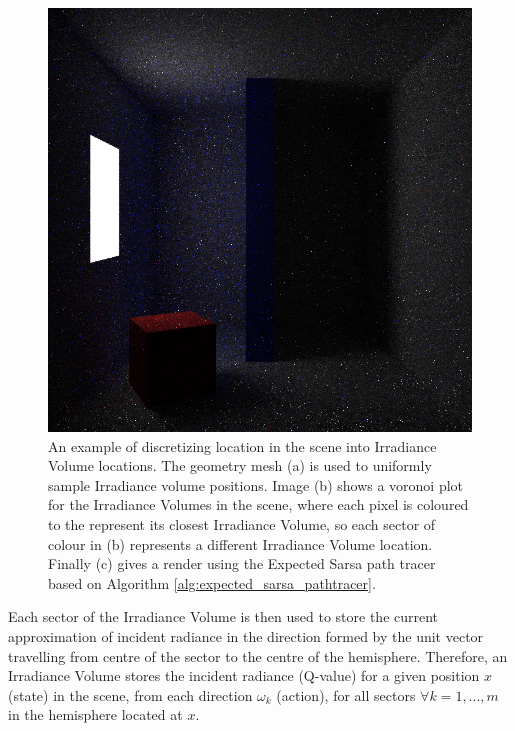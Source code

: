 \documentclass[../dissertation.tex]{subfiles}
\begin{document}
\begin{figure}[!htb]
\endminipage\hfill
{}
\includegraphics[width=1\textwidth]{images/renders/simple_room/reinforcement_16.png}
\endminipage
\caption{An example of discretizing location in the scene into Irradiance Volume locations. The geometry mesh (a) is used to uniformly sample Irradiance volume positions. Image (b) shows a voronoi plot for the Irradiance Volumes in the scene, where each pixel is coloured to the represent its closest Irradiance Volume, so each sector of colour in (b) represents a different Irradiance Volume location. Finally (c) gives a render using the Expected Sarsa path tracer based on Algorithm \ref{alg:expected_sarsa_pathtracer}.}
\label{fig:scene_discretization_example}
\end{figure}

Each sector of the Irradiance Volume is then used to store the current approximation of incident radiance in the direction formed by the unit vector travelling from centre of the sector to the centre of the hemisphere. Therefore, an Irradiance Volume stores the incident radiance (Q-value) for a given position $x$ (state) in the scene, from each direction $\omega_k$ (action), for all sectors $\forall k = 1,...,m$ in the hemisphere located at $x$. 
\end{document}
